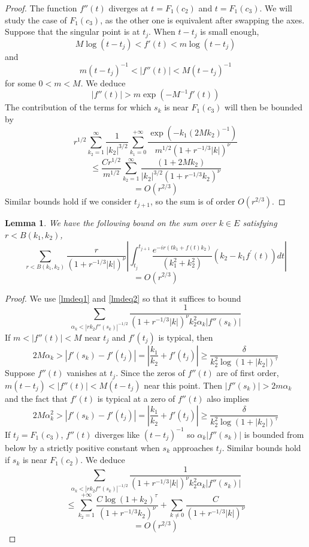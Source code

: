 \documentclass[12pt]{amsart}
\numberwithin{equation}{subsection}
\theoremstyle{definition}
\theoremstyle{plain}
\newtheorem{lemma}[equation]{Lemma}
\begin{document}
\begin{proof}
The function $f''(t)$ diverges at $t=F_1(c_2)$ and $t=F_1(c_3)$.
We will study the case of $F_1(c_3)$, as the other one is equivalent after swapping the axes.
Suppose that the singular point is at $t_j$. When $t-t_j$ is small enough,
\[
M \log (t-t_j) < f'(t) < m \log (t-t_j)
\]
and
\[
m (t-t_j)^{-1}     < |f''(t)| < M (t-t_j)^{-1}
\]
for some $0 < m < M$.
We deduce
\[
|f''(t)| > m \exp(-M^{-1}f'(t))
\]
The contribution of the terms for which $s_k$ is near $F_1(c_3)$ will then be bounded by
\[
r^{1/2}\sum_{k_2=1}^{\infty} \frac{1}{|k_2|^{3/2}} \sum_{k_1=0}^{+\infty}
\frac{\exp \left( -k_1 (2M k_2)^{-1} \right)}
{m^{1/2} (1+r^{-1/3}|k|)^\nu}
\]
\[
\leq \frac{C r^{1/2}}{m^{1/2}} \sum_{k_2=1}^{\infty} \frac{(1+2Mk_2)}{|k_2|^{3/2}(1+r^{-1/3}k_2)^\nu}
\]
\[
= O(r^{2/3})
\]
Similar bounds hold if we consider $t_{j+1}$, so the sum is of order $O(r^{2/3})$.
\end{proof}

\begin{lemma}
\label{lemma1}
We have the following bound on the sum over $k \in E$ satisfying $r < B(k_1,k_2)$,
\[
\sum_{r < B(k_1,k_2)} \frac{r}{(1+r^{-1/3}|k|)^\nu}
\left| \int_{t_j}^{t_{j+1}}
\frac{e^{-ir(t k_1 + f(t) k_2)}}{(k_1^2 + k_2^2)}(k_2 - k_1 f^{'}(t)) dt \right|
\]
\[
= O(r^{2/3})
\]
\end{lemma}
\begin{proof}
We use \eqref{lmdeq1} and \eqref{lmdeq2} so that it suffices to bound
\[
\sum_{\alpha_k< |r k_2 f''(s_k)|^{-1/2}} \frac{1}{(1+r^{-1/3}|k|)^\nu k_2^2 \alpha_k |f''(s_k)|}
\]
If $m < |f''(t)| < M$ near $t_j$ and $f'(t_j)$ is typical, then
\[
2 M \alpha_k > \left| f'(s_k) - f'(t_j) \right| = \left| \frac{k_1}{k_2} + f'(t_j) \right| \geq \frac{\delta}{k_2^2 \log(1+|k_2|)^{\tau}}
\]
Suppose $f''(t)$ vanishes at $t_j$.
Since the zeros of $f''(t)$ are of first order, $m (t-t_j) < |f''(t)| < M(t-t_j)$ near this point.
Then $|f''(s_k)|> 2m \alpha_k$ and the fact that $f'(t)$ is typical at a zero of $f''(t)$ also implies
\[
2 M \alpha_k^2 > \left| f'(s_k) - f'(t_j) \right| = \left| \frac{k_1}{k_2} + f'(t_j) \right| \geq \frac{\delta}{k_2^2 \log(1+|k_2|)^{\tau}}
\]
If $t_j=F_1(c_3)$, $f''(t)$ diverges like $(t-t_j)^{-1}$ so $\alpha_k |f''(s_k)|$ is bounded
from below by a strictly positive constant when $s_k$ approaches $t_j$.
Similar bounds hold if $s_k$ is near $F_1(c_2)$. We deduce
\[
\sum_{\alpha_k< |r k_2 f''(s_k)|^{-1/2}} \frac{1}{(1+r^{-1/3}|k|)^\nu k_2^2 \alpha_k |f''(s_k)|}
\]
\[
\leq \sum_{k_2 = 1}^{+ \infty} \frac{C \log(1 + k_2)^{\tau}}{(1+ r^{-1/3}k_2)^\nu}  + \sum_{k \neq 0} \frac{C}{(1+r^{-1/3}|k|)^\nu}
\]
\[
= O(r^{2/3})
\]
\end{proof}
\end{document}
